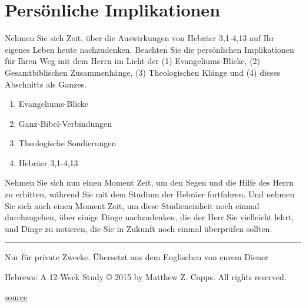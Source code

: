 \documentclass[]{book}
\providecommand{\tightlist}{%
  \setlength{\itemsep}{0pt}\setlength{\parskip}{0pt}}
\begin{document}
\section{Persönliche
Implikationen}\label{persuxf6nliche-implikationen-2}

Nehmen Sie sich Zeit, über die Auswirkungen von Hebräer 3,1-4,13 auf Ihr
eigenes Leben heute nachzudenken. Beachten Sie die persönlichen
Implikationen für Ihren Weg mit dem Herrn im Licht der (1)
Evangeliums-Blicke, (2) Gesamtbiblischen Zusammenhänge, (3)
Theologischen Klänge und (4) dieses Abschnitts als Ganzes.

\begin{enumerate}
\def\labelenumi{\arabic{enumi}.}
\tightlist
\item
  Evangeliums-Blicke
\item
  Ganz-Bibel-Verbindungen
\item
  Theologische Sondierungen
\item
  Hebräer 3,1-4,13
\end{enumerate}

Nehmen Sie sich nun einen Moment Zeit, um den Segen und die Hilfe des
Herrn zu erbitten, während Sie mit dem Studium der Hebräer fortfahren.
Und nehmen Sie sich auch einen Moment Zeit, um diese Studieneinheit noch
einmal durchzugehen, über einige Dinge nachzudenken, die der Herr Sie
vielleicht lehrt, und Dinge zu notieren, die Sie in Zukunft noch einmal
überprüfen sollten.

\begin{center}\rule{0.5\linewidth}{0.5pt}\end{center}

Nur für private Zwecke. Übersetzt aus dem Englischen von eurem Diener

Hebrews: A 12-Week Study © 2015 by Matthew Z. Capps. All rights
reserved.

\href{https://www.thegospelcoalition.org/course/knowing-bible-hebrews/\#week-3-jesus-is-superior-to-angelic-beings-heb-15-218}{source}


\end{document}
